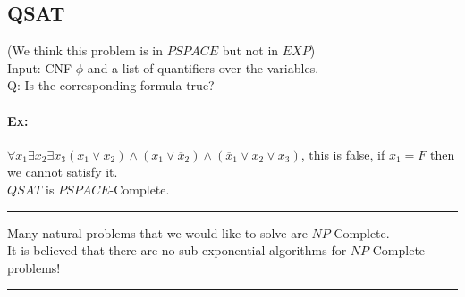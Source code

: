 \documentclass[12 pt]{article}
\begin{document}
          \subsection{QSAT} (We think this problem is in $PSPACE$ but
          not in $EXP$)
          \\ Input: CNF $\phi$ and a list of quantifiers over the
          variables.
          \\ Q: Is the corresponding formula true?
          \paragraph{Ex:}
          $\forall x_1 \exists x_2 \exists x_3 (x_1 \lor x_2) \land
          (x_1 \lor \overline{x}_2)\land(\overline{x}_1 \lor x_2 \lor
          x_3)$, this is false, if $x_1 = F$ then we cannot satisfy
          it.
          \\ $QSAT$ is $PSPACE$-Complete.
          \\ \noindent \rule{\textwidth}{0.5pt}
          Many natural problems that we would like to solve are
          $NP$-Complete.
          \\ It is believed that there are no sub-exponential
          algorithms for $NP$-Complete problems!
          \\ \noindent \rule{\textwidth}{0.5pt}
\end{document}
